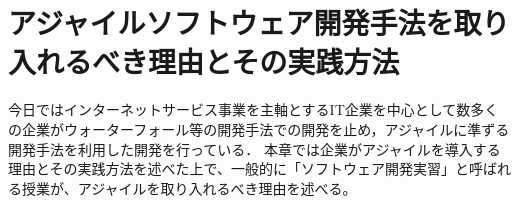 \chapter{アジャイルソフトウェア開発手法を取り入れるべき理由とその実践方法}

今日ではインターネットサービス事業を主軸とするIT企業を中心として数多くの企業がウォーターフォール等の開発手法での開発を止め，アジャイルに準ずる開発手法を利用した開発を行っている\cite{scrumスクラム}．
本章では企業がアジャイルを導入する理由とその実践方法を述べた上で、一般的に「ソフトウェア開発実習」と呼ばれる授業が、アジャイルを取り入れるべき理由を述べる。



%
